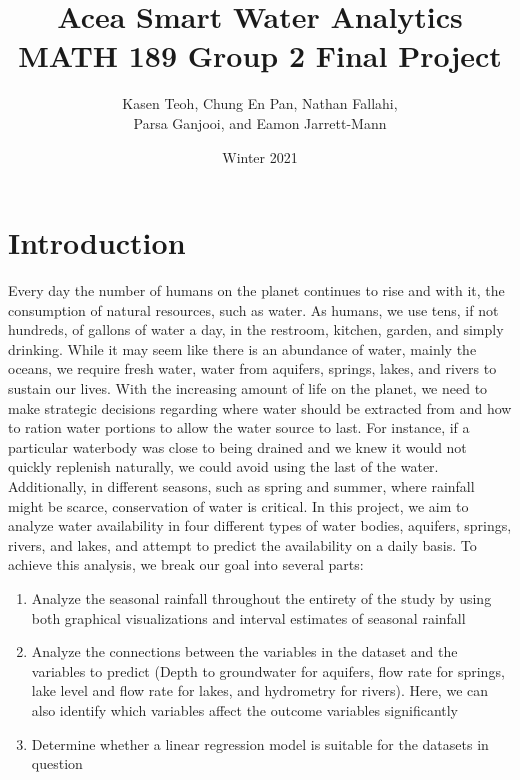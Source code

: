 \documentclass[12pt, letterpaper]{article}
\title{
    Acea Smart Water Analytics \\
    \large MATH 189 Group 2 Final Project}
\author{
    Kasen Teoh, 
    Chung En Pan, 
    Nathan Fallahi, \\
    Parsa Ganjooi, 
    and Eamon Jarrett-Mann
}
\date{Winter 2021}
\begin{document}
\maketitle

\section{Introduction}
Every day the number of humans on the planet continues to rise and with it, the consumption of natural resources, such as water. As humans, we use tens, if not hundreds, of gallons of water a day, in the restroom, kitchen, garden, and simply drinking. While it may seem like there is an abundance of water, mainly the oceans, we require fresh water, water from aquifers, springs, lakes, and rivers to sustain our lives. With the increasing amount of life on the planet, we need to make strategic decisions regarding where water should be extracted from and how to ration water portions to allow the water source to last. For instance, if a particular waterbody was close to being drained and we knew it would not quickly replenish naturally, we could avoid using the last of the water. Additionally, in different seasons, such as spring and summer, where rainfall might be scarce, conservation of water is critical. In this project, we aim to analyze water availability in four different types of water bodies, aquifers, springs, rivers, and lakes, and attempt to predict the availability on a daily basis. To achieve this analysis, we break our goal into several parts:
\begin{enumerate}
    \item Analyze the seasonal rainfall throughout the entirety of the study by using both graphical visualizations and interval estimates of seasonal rainfall 
    \item Analyze the connections between the variables in the dataset and the variables to predict (Depth to groundwater for aquifers, flow rate for springs, lake level and flow rate for lakes, and hydrometry for rivers). Here, we can also identify which variables affect the outcome variables significantly
    \item Determine whether a linear regression model is suitable for the datasets in question
\end{enumerate}
\end{document}
